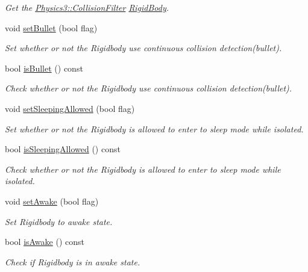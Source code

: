 \begin{DoxyCompactItemize}
\begin{DoxyCompactList}\small\item\em Get the \hyperlink{class_magnum_1_1_physics3_1_1_collision_filter}{Physics3\+::\+Collision\+Filter} \hyperlink{class_magnum_1_1_physics3_1_1_rigid_body}{Rigid\+Body}. \end{DoxyCompactList}\item 
void \hyperlink{class_magnum_1_1_physics3_1_1_rigid_body_a5dca7e1659d07507231c1bdd4a2c4493}{set\+Bullet} (bool flag)
\begin{DoxyCompactList}\small\item\em Set whether or not the Rigidbody use continuous collision detection(bullet). \end{DoxyCompactList}\item 
bool \hyperlink{class_magnum_1_1_physics3_1_1_rigid_body_ac293002d6ddaef528eb85585fb9a20f2}{is\+Bullet} () const 
\begin{DoxyCompactList}\small\item\em Check whether or not the Rigidbody use continuous collision detection(bullet). \end{DoxyCompactList}\item 
void \hyperlink{class_magnum_1_1_physics3_1_1_rigid_body_a452af87be5e21e2fb9032ab730e9d37b}{set\+Sleeping\+Allowed} (bool flag)
\begin{DoxyCompactList}\small\item\em Set whether or not the Rigidbody is allowed to enter to sleep mode while isolated. \end{DoxyCompactList}\item 
bool \hyperlink{class_magnum_1_1_physics3_1_1_rigid_body_aea6ef6ac7f71c54aa1743cde888d1085}{is\+Sleeping\+Allowed} () const 
\begin{DoxyCompactList}\small\item\em Check whether or not the Rigidbody is allowed to enter to sleep mode while isolated. \end{DoxyCompactList}\item 
void \hyperlink{class_magnum_1_1_physics3_1_1_rigid_body_af7f8e42c2678cc8a50fbf2e03353d711}{set\+Awake} (bool flag)
\begin{DoxyCompactList}\small\item\em Set Rigidbody to awake state. \end{DoxyCompactList}\item 
bool \hyperlink{class_magnum_1_1_physics3_1_1_rigid_body_a8681f121f02afc0d80a58b57b4e7cac8}{is\+Awake} () const 
\begin{DoxyCompactList}\small\item\em Check if Rigidbody is in awake state. \end{DoxyCompactList}\item 

\end{DoxyCompactItemize}
